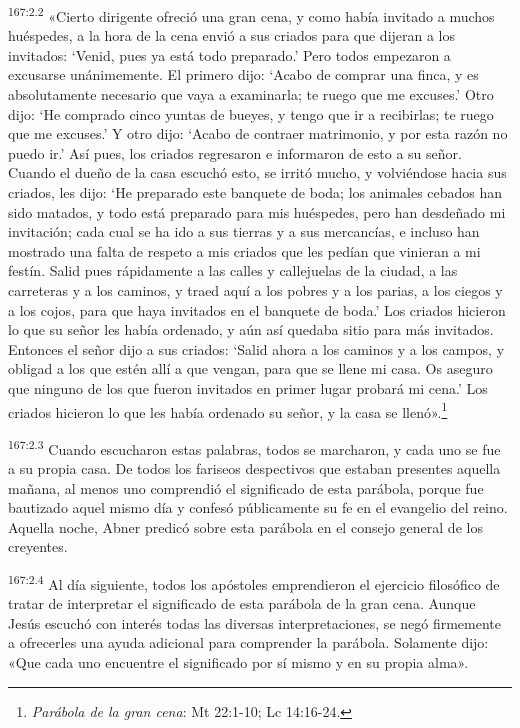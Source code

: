\par
\textsuperscript{167:2.2} «Cierto dirigente ofreció una gran cena, y como había invitado a muchos huéspedes, a la hora de la cena envió a sus criados para que dijeran a los invitados: `Venid, pues ya está todo preparado.' Pero todos empezaron a excusarse unánimemente. El primero dijo: `Acabo de comprar una finca, y es absolutamente necesario que vaya a examinarla; te ruego que me excuses.' Otro dijo: `He comprado cinco yuntas de bueyes, y tengo que ir a recibirlas; te ruego que me excuses.' Y otro dijo: `Acabo de contraer matrimonio, y por esta razón no puedo ir.' Así pues, los criados regresaron e informaron de esto a su señor. Cuando el dueño de la casa escuchó esto, se irritó mucho, y volviéndose hacia sus criados, les dijo: `He preparado este banquete de boda; los animales cebados han sido matados, y todo está preparado para mis huéspedes, pero han desdeñado mi invitación; cada cual se ha ido a sus tierras y a sus mercancías, e incluso han mostrado una falta de respeto a mis criados que les pedían que vinieran a mi festín. Salid pues rápidamente a las calles y callejuelas de la ciudad, a las carreteras y a los caminos, y traed aquí a los pobres y a los parias, a los ciegos y a los cojos, para que haya invitados en el banquete de boda.' Los criados hicieron lo que su señor les había ordenado, y aún así quedaba sitio para más invitados. Entonces el señor dijo a sus criados: `Salid ahora a los caminos y a los campos, y obligad a los que estén allí a que vengan, para que se llene mi casa. Os aseguro que ninguno de los que fueron invitados en primer lugar probará mi cena.' Los criados hicieron lo que les había ordenado su señor, y la casa se llenó».\footnote{\textit{Parábola de la gran cena}: Mt 22:1-10; Lc 14:16-24.}

\par
\textsuperscript{167:2.3} Cuando escucharon estas palabras, todos se marcharon, y cada uno se fue a su propia casa. De todos los fariseos despectivos que estaban presentes aquella mañana, al menos uno comprendió el significado de esta parábola, porque fue bautizado aquel mismo día y confesó públicamente su fe en el evangelio del reino. Aquella noche, Abner predicó sobre esta parábola en el consejo general de los creyentes.

\par
\textsuperscript{167:2.4} Al día siguiente, todos los apóstoles emprendieron el ejercicio filosófico de tratar de interpretar el significado de esta parábola de la gran cena. Aunque Jesús escuchó con interés todas las diversas interpretaciones, se negó firmemente a ofrecerles una ayuda adicional para comprender la parábola. Solamente dijo: «Que cada uno encuentre el significado por sí mismo y en su propia alma».

